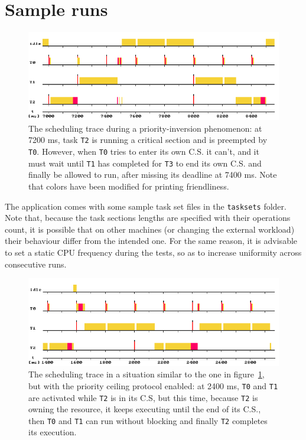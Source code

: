 \documentclass[paper=a4, fontsize=11pt]{scrartcl}
\newcommand{\mono}[1]{\texttt{#1}}
\numberwithin{equation}{section}        %
\numberwithin{figure}{section}          %
\numberwithin{table}{section}               %
\numberwithin{fragment}{section}
\begin{document}
\section{Sample runs}\label{sec:runs}

\begin{figure}
  \centering
  \includegraphics[width=1\textwidth]{img/inversion.png}
  \caption{\label{fig:inversion} The scheduling trace during a priority-inversion phenomenon: at 7200 ms, task \mono{T2} is running a critical section and is preempted by \mono{T0}. However, when \mono{T0} tries to enter its own C.S. it can't, and it must wait until \mono{T1} has completed for \mono{T3} to end its own C.S. and finally be allowed to run, after missing its deadline at 7400 ms. Note that colors have been modified for printing friendliness.}
\end{figure}

The application comes with some sample task set files in the \mono{tasksets} folder. Note that, because the task sections lengths are specified with their operations count, it is possible that on other machines (or changing the external workload) their behaviour differ from the intended one. For the same reason, it is advisable to set a static CPU frequency during the tests, so as to increase uniformity across consecutive runs.

\begin{figure}
  \centering
  \includegraphics[width=1\textwidth]{img/noinversion_ceiling.png}
  \caption{\label{fig:noinversion-ceiling} The scheduling trace in a situation similar to the one in figure~\ref{fig:inversion}, but with the priority ceiling protocol enabled: at 2400 ms, \mono{T0} and \mono{T1} are activated while \mono{T2} is in its C.S, but this time, because \mono{T2} is owning the resource, it keeps executing until the end of its C.S., then \mono{T0} and \mono{T1} can run without blocking and finally \mono{T2} completes its execution.}
\end{figure}
\end{document}
